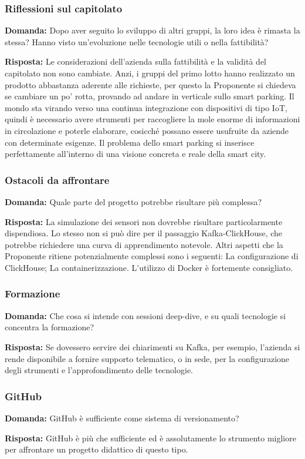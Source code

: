 \subsubsection{Riflessioni sul capitolato}
\textbf{Domanda:} Dopo aver seguito lo sviluppo di altri gruppi, la loro idea è rimasta la stessa? Hanno visto un’evoluzione nelle tecnologie utili o nella fattibilità?

\textbf{Risposta:} Le considerazioni dell’azienda sulla fattibilità e la validità del capitolato non sono cambiate. Anzi, i gruppi del primo lotto hanno realizzato un prodotto abbastanza aderente alle richieste, per questo la Proponente si chiedeva se cambiare un po' rotta, provando ad andare in verticale sullo smart parking. Il mondo sta virando verso una continua integrazione con dispositivi di tipo IoT, quindi è necessario avere strumenti per raccogliere la mole enorme di informazioni in circolazione e poterle elaborare, cosicché possano essere usufruite da aziende con determinate esigenze. Il problema dello smart parking si inserisce perfettamente all’interno di una visione concreta e reale della smart city.

\subsubsection{Ostacoli da affrontare}
\textbf{Domanda:} Quale parte del progetto potrebbe risultare più complessa?

\textbf{Risposta:} La simulazione dei sensori non dovrebbe risultare particolarmente dispendiosa. Lo stesso non si può dire per il passaggio Kafka-ClickHouse, che potrebbe richiedere una curva di apprendimento notevole. Altri aspetti che la Proponente ritiene potenzialmente complessi sono i seguenti:
La configurazione di ClickHouse;
La containerizzazione.
L’utilizzo di Docker è fortemente consigliato.

\subsubsection{Formazione}
\textbf{Domanda:} Che cosa si intende con sessioni deep-dive, e su quali tecnologie si concentra la formazione?

\textbf{Risposta:} Se dovessero servire dei chiarimenti su Kafka, per esempio, l'azienda si rende disponibile a fornire supporto telematico, o in sede, per la configurazione degli strumenti e l’approfondimento delle tecnologie.

\subsubsection{GitHub}
\textbf{Domanda:} GitHub è sufficiente come sistema di versionamento?

\textbf{Risposta:} GitHub è più che sufficiente ed è assolutamente lo strumento migliore per affrontare un progetto didattico di questo tipo.
